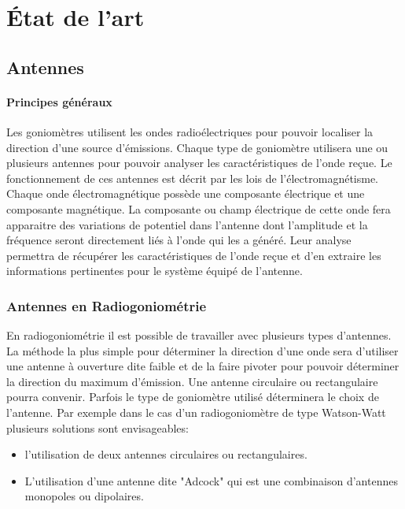 \chapter{État de l'art}


\section{Antennes}

\subsubsection{Principes généraux}

	Les goniomètres utilisent les ondes radioélectriques pour pouvoir localiser la direction d'une source d'émissions. Chaque type de goniomètre utilisera une ou plusieurs antennes pour pouvoir analyser les caractéristiques de l'onde reçue. 
	Le fonctionnement de ces antennes est décrit par les lois de l'électromagnétisme. Chaque onde électromagnétique possède une composante électrique et une composante magnétique. La composante ou champ électrique de cette onde fera apparaitre des variations de potentiel dans l'antenne dont l'amplitude et la fréquence seront directement liés à l'onde qui les a généré. Leur analyse permettra de récupérer les caractéristiques de l'onde reçue et d'en extraire les informations pertinentes pour le système équipé de l'antenne.
	
\subsection{Antennes en Radiogoniométrie}

	En radiogoniométrie il est possible de travailler avec plusieurs types d'antennes. La méthode la plus simple pour déterminer la direction d'une onde sera d'utiliser une antenne à ouverture dite faible et de la faire pivoter pour pouvoir déterminer la direction du maximum d'émission. Une antenne circulaire ou rectangulaire pourra convenir. Parfois le type de goniomètre utilisé déterminera le choix de l'antenne. Par exemple dans le cas d'un radiogoniomètre de type Watson-Watt plusieurs solutions sont envisageables: 
	
\begin{itemize}

\item l'utilisation de deux antennes circulaires ou rectangulaires.

\item L'utilisation d'une antenne dite "Adcock" qui est une combinaison d'antennes monopoles ou dipolaires. 

\end{itemize} 

